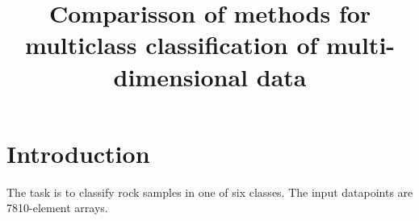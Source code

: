 \documentclass{article}
\title{Comparisson of methods for multiclass classification of multi-dimensional data}
\begin{document}
\maketitle

\section{Introduction}
The task is to classify rock samples in one of six classes.
The input datapoints are 7810-element arrays.
\end{document}
